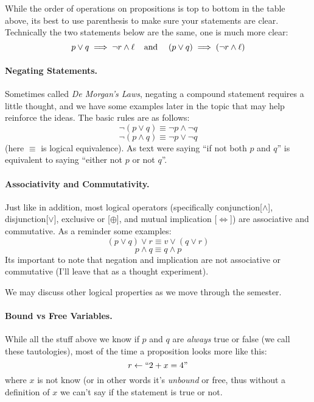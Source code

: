 While the order of operations on propositions is top to bottom in the table above, 
its best to use parenthesis to make sure your statements are clear. 
Technically the two statements below are the same, one is much more clear:
\[
p \vee q \implies \neg r \wedge \ell \;\;\;\; \textnormal{and}\;\;\;\; \left(p\vee q\right) \implies \left(\neg r \wedge \ell\right) 
\]

\paragraph{Negating Statements.}
Sometimes called \emph{De Morgan's Laws}, negating a compound statement requires a little thought, 
and we have some examples later in the topic that may help reinforce the ideas. 
The basic rules are as follows:
\[ \neg\left(p \vee q\right) \equiv \neg p \wedge \neg q\]
\[ \neg\left(p \wedge q\right) \equiv \neg p \vee \neg q\]
(here $\equiv$ is logical equivalence).
As text were saying ``if not both $p$ and $q$'' is equivalent to saying ``either not $p$ or not $q$''.

\paragraph{Associativity and Commutativity.}
Just like in addition, most logical operators (specifically conjunction[$\wedge$], disjunction[$\vee$], exclusive or [$\oplus$], and mutual implication [$\iff$]) are associative and commutative.
As a reminder some examples:
\begin{equation}
\left(p \vee q\right) \vee r \equiv v \vee \left(q \vee r\right) \tag{associativity}
\end{equation}
\begin{equation}
p \wedge q \equiv q \wedge p \tag{commutativity}
\end{equation}
Its important to note that negation and implication are not associative or commutative (I'll leave that as a thought experiment).

We may discuss other logical properties as we move through the semester.  

\paragraph{Bound vs Free Variables.} While all the stuff above we know if $p$ and $q$ are \textit{always} true or false (we call these tautologies), 
most of the time a proposition looks more like this: 
\[ r \leftarrow \textnormal{``}2+x=4\textnormal{''}\]
where $x$ is not know (or in other words it's \emph{unbound} or free, thus without a definition of $x$ we can't say if the statement is true or not. 

